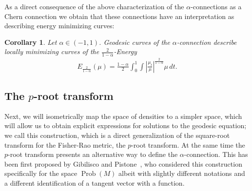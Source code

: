\documentclass[11pt]{amsart}
\newtheorem{corollary}[theorem]{Corollary}
\theoremstyle{definition}
\newcommand{\Abs}[1]{\left|#1\right|}
\newcommand{\Prob}{\operatorname{Prob}(M)}
\begin{document}
As a direct consequence of the above characterization of the $\alpha$-connections as a Chern connection we obtain that these connections have an interpretation as describing energy minimizing curves:
\begin{corollary}
Let $\alpha\in (-1,1)$. Geodesic curves of the $\alpha$-connection describe locally minimizing curves of the $\frac{2}{1-\alpha}$-Energy 
\begin{align*}
E_{\frac{2}{1-\alpha}}(\mu)=\frac{1-\alpha}{2}\int_0^1 \int\Abs{\frac{\mu_t}{\mu}}^{\frac{2}{1-\alpha}}\mu\, dt.   
\end{align*}
\end{corollary}

\subsection{The $p$-root transform}
Next, we will isometrically map the space of densities to a simpler space, which will allow us to obtain explicit expressions for solutions to the geodesic equation; we call this construction, which is a direct generalization of the square-root transform for the Fisher-Rao metric, the $p$-root transform. At the same time the $p$-root transform presents an alternative way to define the $\alpha$-connection. This has been first proposed by Gibilisco and Pistone~\cite{gibilisco1998connections}, who considered this construction specifically for the  space $\Prob$ albeit with slightly different notations and a different identification of a tangent vector with a function. 
\end{document}

